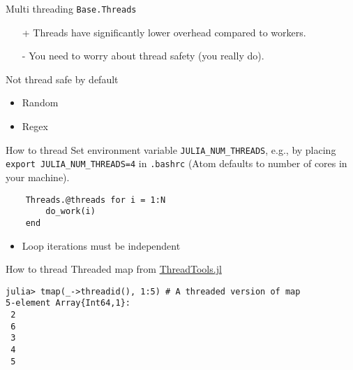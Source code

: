 \documentclass[10pt]{beamer}
\begin{document}
\begin{frame}{Multi threading}{}
    \texttt{Base.Threads}
    \begin{itemize}
        \item[+] Threads have significantly lower overhead compared to workers.
        \item[-] You need to worry about thread safety (you really do).
    \end{itemize}
\end{frame}

\begin{frame}{Not thread safe by default}{}
    \begin{itemize}
        \item Random
        \item Regex
    \end{itemize}
\end{frame}

\begin{frame}[fragile]{How to thread}{}
    Set environment variable \texttt{JULIA\_NUM\_THREADS}, e.g., by placing \texttt{export JULIA\_NUM\_THREADS=4} in \texttt{.bashrc} (Atom defaults to number of cores in your machine).

    \begin{verbatim}
    Threads.@threads for i = 1:N
        do_work(i)
    end
    \end{verbatim}

    \begin{itemize}
        \item Loop iterations must be independent
    \end{itemize}
\end{frame}

\begin{frame}[fragile]{How to thread}{}
    Threaded map from \href{https://github.com/baggepinnen/ThreadTools.jl}{ThreadTools.jl}
    \begin{verbatim}
julia> tmap(_->threadid(), 1:5) # A threaded version of map
5-element Array{Int64,1}:
 2
 6
 3
 4
 5
    \end{verbatim}


\end{frame}
\end{document}
